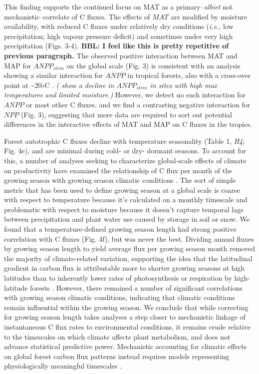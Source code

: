 \documentclass[
]{article}
\begin{document}
{This finding supports the continued focus on MAT as a
primary--\emph{albiet} not mechanistic--correlate of C fluxes. The
effects of \(MAT\) are modified by moisture availability, with reduced C
fluxes under relatively dry conditions (\emph{i.e.}, low precipitation;
high vapour pressure deficit) and sometimes under very high
precipitation (Figs. 3-4). \textbf{BBL: I feel like this is pretty
repetitive of previous paragraph.} The observed positive interaction
between MAT and MAP for \(ANPP_{stem}\) on the global scale (Fig. 3) is
consistent with an analysis showing a similar interaction for \(ANPP\)
in tropical forests, also with a cross-over point at
\textasciitilde20\(\circ\)C \citep{taylor_temperature_2017}.
\emph{(\citet{sullivan_sensitivity_2020} show a decline in
\(ANPP_{stem}\) in sites with high max temperatures and limited
moisture.)} However, we detect no such interaction for \(ANPP\) or most
other C fluxes, and we find a contrasting negative interaction for
\(NPP\) (Fig. 3), suggesting that more data are required to sort out
potential differences in the interactive effects of MAT and MAP on C
fluxes in the tropics.

Forest autotrophic C fluxes decline with temperature seasonality (Table
1, \emph{H4}; Fig. 4e), and are minimal during cold- or dry- dormant
seasons. To account for this, a number of analyses seeking to
characterize global-scale effects of climate on productivity have
examined the relationship of C flux per month of the growing season with
growing season climatic conditions \citep[Table 1,
\emph{H5};][]{kerkhoff_plant_2005, anderson_temperature-dependence_2006, enquist_adaptive_2007, michaletz_convergence_2014}.
The sort of simple metric that has been used to define growing season at
a global scale \citep{kerkhoff_plant_2005} is coarse with respect to
temperature because it's calculated on a monthly timescale and
problematic with respect to moisture because it doesn't capture temporal
lags between precipitation and plant water use caused by storage in soil
or snow. We found that a temperature-defined growing season length had
strong positive correlation with C fluxes (Fig. 4f), but was never the
best. Dividing annual fluxes by growing season length to yield average
flux per growing season month removed the majority of climate-related
variation, supporting the idea that the latitudinal gradient in carbon
flux is attributable more to shorter growing seasons at high latitudes
than to inherently lower rates of photosynthesis or respiration by
high-latitude forests \citep{enquist_adaptive_2007}. However, there
remained a number of significant correlations with growing season
climatic conditions, indicating that climatic conditions remain
influential within the growing season. We conclude that while correcting
for growing season length takes analyses a step closer to mechanistic
linkage of instantaneous C flux rates to environmental conditions, it
remains crude relative to the timescales on which climate affects plant
metabolism, and does not advance statistical predictive power.
Mechanistic accounting for climatic effects on global forest carbon flux
patterns instead requires models representing physiologically meaningful
timescales \citep[e.g., \textbf{REFS};][]{longo_biophysics_2019}.

}
\end{document}

